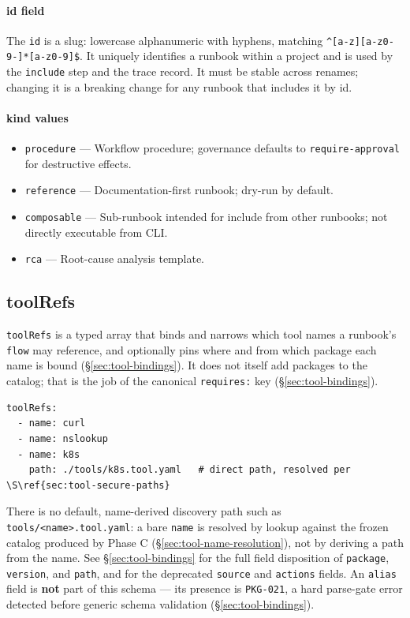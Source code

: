 \paragraph{id field}
The \texttt{id} is a slug: lowercase alphanumeric with hyphens, matching
\texttt{\^{}[a-z][a-z0-9-]*[a-z0-9]\$}.  It uniquely identifies a runbook within
a project and is used by the \texttt{include} step and the trace record.  It must
be stable across renames; changing it is a breaking change for any runbook that
includes it by id.

\paragraph{kind values}
\begin{itemize}
  \item \texttt{procedure} --- Workflow procedure; governance defaults
        to \texttt{require-approval} for destructive effects.
  \item \texttt{reference} — Documentation-first runbook; dry-run by default.
  \item \texttt{composable} — Sub-runbook intended for include from other
        runbooks; not directly executable from CLI.
  \item \texttt{rca} — Root-cause analysis template.
\end{itemize}

\subsection{toolRefs}
\label{subsec:toolrefs}

\texttt{toolRefs} is a typed array that binds and narrows which tool names a
runbook's \texttt{flow} may reference, and optionally pins where and from
which package each name is bound (\S\ref{sec:tool-bindings}). It does not
itself add packages to the catalog; that is the job of the canonical
\texttt{requires:} key (\S\ref{sec:tool-bindings}).

\begin{verbatim}
toolRefs:
  - name: curl
  - name: nslookup
  - name: k8s
    path: ./tools/k8s.tool.yaml   # direct path, resolved per \S\ref{sec:tool-secure-paths}
\end{verbatim}

There is no default, name-derived discovery path such as
\texttt{tools/<name>.tool.yaml}: a bare \texttt{name} is resolved by lookup
against the frozen catalog produced by Phase C
(\S\ref{sec:tool-name-resolution}), not by deriving a path from the name. See
\S\ref{sec:tool-bindings} for the full field disposition of \texttt{package},
\texttt{version}, and \texttt{path}, and for the deprecated \texttt{source}
and \texttt{actions} fields. An \texttt{alias} field is \textbf{not}
part of this schema --- its presence is \texttt{PKG-021}, a hard parse-gate
error detected before generic schema validation (\S\ref{sec:tool-bindings}).

